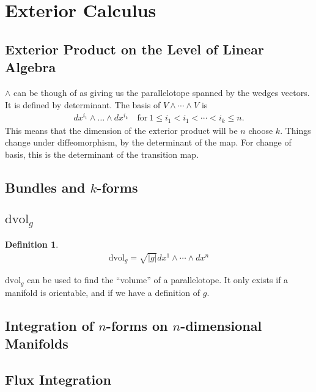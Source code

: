 \documentclass[10pt]{amsart}
\newtheorem{definition}{Definition}[section]
\newcommand{\dvol}{\text{dvol}_g}
\newcommand{\rmg}{\sqrt{\left\vert g\right\vert}}
\newcommand{\wfb}{dx^1\wedge\cdots\wedge dx^n}
\newcommand{\wvs}{V\wedge\cdots\wedge V}
\renewcommand{\*}{\star}
\begin{document}
\section{Exterior Calculus}%
\label{sec:exterior_calculus}

\subsection{Exterior Product on the Level of Linear Algebra}%
\label{sub:exterior_product_on_the_level_of_linear_algebra}

$\wedge$ can be though of as giving us the parallelotope spanned by the wedges
vectors. It is defined by determinant. The basis of $\wvs$ is
\begin{align*}
  dx^{i_1}\wedge\ldots\wedge dx^{i_k}\quad\text{for}\ 1\leq
    i_1<i_1<\cdots<i_k\leq n.
\end{align*}
This means that the dimension of the exterior product will be $n$ choose $k$.
Things change under diffeomorphism, by the determinant of the map. For change
of basis, this is the determinant of the transition map.

\subsection{Bundles and $k$-forms}%
\label{sub:bundles_and_k_forms}

\subsection{$\dvol$}%
\label{sub:_dvol_}

\begin{definition}
   \begin{align*}
     \dvol=\rmg\wfb
   \end{align*}
\end{definition}

$\dvol$ can be used to find the ``volume'' of a parallelotope. It only exists
if a manifold is orientable, and if we have a definition of $g$.

\subsection{Integration of $n$-forms on $n$-dimensional Manifolds}%
\label{sub:integration_of_n_forms_on_n_dimensional_manifolds}

\subsection{Flux Integration}%
\label{sub:flux_integration}
\end{document}
